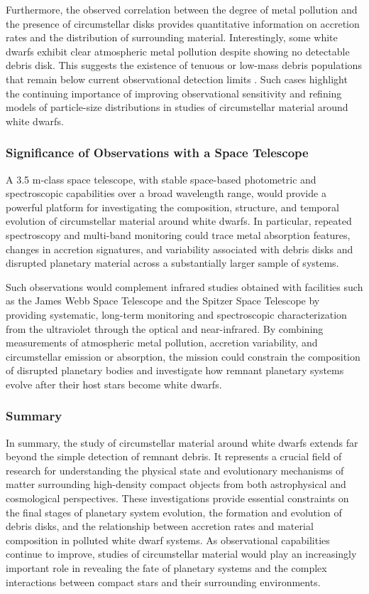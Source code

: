 Furthermore, the observed correlation between the degree of metal pollution and the presence of circumstellar disks provides quantitative information on accretion rates and the distribution of surrounding material. Interestingly, some white dwarfs exhibit clear atmospheric metal pollution despite showing no detectable debris disk. This suggests the existence of tenuous or low-mass debris populations that remain below current observational detection limits \cite{rocchetto2015}. Such cases highlight the continuing importance of improving observational sensitivity and refining models of particle-size distributions in studies of circumstellar material around white dwarfs.

\subsubsection{Significance of Observations with a Space Telescope}

A 3.5 m-class space telescope, with stable space-based photometric and spectroscopic capabilities over a broad wavelength range, would provide a powerful platform for investigating the composition, structure, and temporal evolution of circumstellar material around white dwarfs. In particular, repeated spectroscopy and multi-band monitoring could trace metal absorption features, changes in accretion signatures, and variability associated with debris disks and disrupted planetary material across a substantially larger sample of systems.

Such observations would complement infrared studies obtained with facilities such as the James Webb Space Telescope and the Spitzer Space Telescope by providing systematic, long-term monitoring and spectroscopic characterization from the ultraviolet through the optical and near-infrared. By combining measurements of atmospheric metal pollution, accretion variability, and circumstellar emission or absorption, the mission could constrain the composition of disrupted planetary bodies and investigate how remnant planetary systems evolve after their host stars become white dwarfs.

\subsubsection{Summary}

In summary, the study of circumstellar material around white dwarfs extends far beyond the simple detection of remnant debris. It represents a crucial field of research for understanding the physical state and evolutionary mechanisms of matter surrounding high-density compact objects from both astrophysical and cosmological perspectives. These investigations provide essential constraints on the final stages of planetary system evolution, the formation and evolution of debris disks, and the relationship between accretion rates and material composition in polluted white dwarf systems. As observational capabilities continue to improve, studies of circumstellar material would play an increasingly important role in revealing the fate of planetary systems and the complex interactions between compact stars and their surrounding environments.

